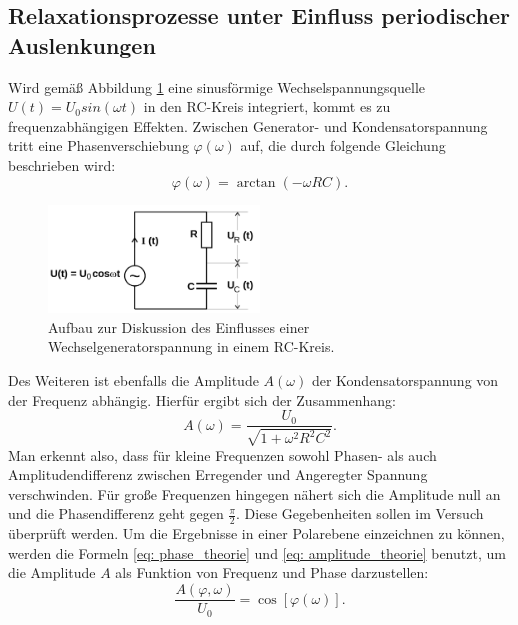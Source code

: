 \subsection{Relaxationsprozesse unter Einfluss periodischer Auslenkungen}
Wird gemäß Abbildung \ref{fig: aufbau_2} eine sinusförmige Wechselspannungsquelle $U(t) = U_0sin(\omega t)$ in den RC-Kreis integriert, kommt es zu frequenzabhängigen
Effekten. Zwischen Generator- und Kondensatorspannung tritt eine Phasenverschiebung $\varphi(\omega)$ auf, die durch folgende Gleichung
beschrieben wird:
\begin{equation}
  \varphi(\omega) = \arctan(-\omega RC).
  \label{eq: phase_theorie}
\end{equation}
\FloatBarrier
\begin{figure}
  \centering
\includegraphics[width = 0.5\textwidth]{pics/aufbau_2.png}
\caption{Aufbau zur Diskussion des Einflusses einer Wechselgeneratorspannung in einem RC-Kreis\cite{anleitung353}. }
\label{fig: aufbau_2}
\end{figure}
Des Weiteren ist ebenfalls die Amplitude $A(\omega)$ der Kondensatorspannung von der Frequenz abhängig. Hierfür ergibt sich der Zusammenhang:
\begin{equation}
  A(\omega) = \frac{U_0}{\sqrt{1 +\omega^2R^2C^2}}.
  \label{eq: amplitude_theorie}
\end{equation}
Man erkennt also, dass für kleine Frequenzen sowohl Phasen- als auch Amplitudendifferenz zwischen Erregender und Angeregter Spannung verschwinden.
Für große Frequenzen hingegen nähert sich die Amplitude null an und die Phasendifferenz geht gegen $\frac{\pi}{2}$. Diese Gegebenheiten sollen
im Versuch überprüft werden. Um die Ergebnisse in einer Polarebene einzeichnen zu können, werden die Formeln \eqref{eq: phase_theorie} und %
\eqref{eq: amplitude_theorie} benutzt, um die Amplitude $A$ als Funktion von Frequenz und Phase darzustellen:
\begin{equation}
\frac{A(\varphi, \omega)}{U_0} = \cos\left[\varphi(\omega)\right].
  \label{eq: amplitude_phase}
\end{equation}

